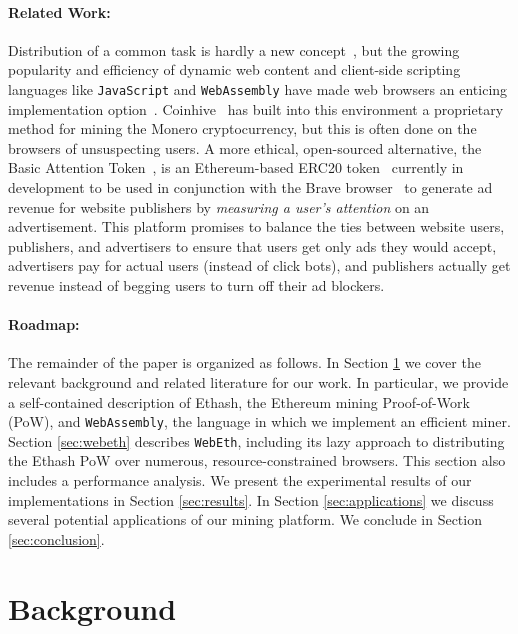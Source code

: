 \documentclass[runningheads]{llncs}
\begin{document}
\paragraph{Related Work:}
Distribution of a common task is hardly a new concept~\cite{scheduling,parallel,orca}, but the growing popularity and efficiency of dynamic web content and client-side scripting languages like \verb|JavaScript| and \verb|WebAssembly|
have made web browsers an enticing implementation option~\cite{WebFlow,Duda,Cushing}.  Coinhive~\cite{coinhive} has
built into this environment a proprietary method for mining the Monero cryptocurrency, but this is often done on
the browsers of unsuspecting users.  A more ethical, open-sourced alternative, the Basic Attention Token~\cite{basicAttentionToken}, is an Ethereum-based ERC20 token~\cite{erc20} currently in development to be used in conjunction with the Brave browser~\cite{BraveBrowser} to generate ad revenue for website publishers by \emph{measuring a user's attention} on an advertisement. This platform promises to balance the ties between website users, publishers, and advertisers to ensure that users get only ads they would accept, advertisers pay for actual users (instead of click bots), and publishers actually get revenue instead of begging users to turn off their ad blockers.

\paragraph{Roadmap:}
The remainder of the paper is organized as follows. In Section \ref{sec:background} we cover the relevant background and related literature for our work.  In particular, we provide a self-contained description of Ethash, the Ethereum mining Proof-of-Work (PoW), and \verb|WebAssembly|, the language in which we implement an efficient miner. Section \ref{sec:webeth} describes \verb|WebEth|, including its lazy approach to distributing the Ethash PoW over numerous, resource-constrained browsers. This section also includes a performance analysis. We present the experimental results of our implementations in Section \ref{sec:results}. In Section \ref{sec:applications} we discuss several potential applications of our mining platform. We conclude in Section \ref{sec:conclusion}.  

\section{Background}
\label{sec:background}
\end{document}
